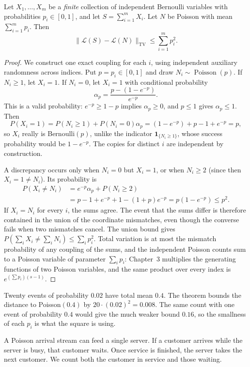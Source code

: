 \begin{theorem}[Le Cam]\label{thm:lecam}
Let $X_1,\ldots,X_m$ be a \emph{finite} collection of independent Bernoulli variables with probabilities $p_i\in[0,1]$, and let $S=\sum_{i=1}^m X_i$. Let $N$ be Poisson with mean $\sum_{i=1}^m p_i$. Then
\[
 \|\mathcal L(S)-\mathcal L(N)\|_{\mathrm{TV}}\le\sum_{i=1}^m p_i^2.
\]
\end{theorem}
\begin{proof}
We construct one exact coupling for each $i$, using independent auxiliary randomness across indices. Put $p=p_i\in[0,1]$ and draw $N_i\sim\operatorname{Poisson}(p)$. If $N_i\ge1$, let $X_i=1$. If $N_i=0$, let $X_i=1$ with conditional probability
\[
\alpha_p=\frac{p-(1-e^{-p})}{e^{-p}}.
\]
This is a valid probability: $e^{-p}\ge1-p$ implies $\alpha_p\ge0$, and $p\le1$ gives $\alpha_p\le1$. Then
\[
P(X_i=1)=P(N_i\ge1)+P(N_i=0)\alpha_p=(1-e^{-p})+p-1+e^{-p}=p,
\]
so $X_i$ really is Bernoulli$(p)$, unlike the indicator $\mathbf1_{\{N_i\ge1\}}$, whose success probability would be $1-e^{-p}$. The copies for distinct $i$ are independent by construction.

A discrepancy occurs only when $N_i=0$ but $X_i=1$, or when $N_i\ge2$ (since then $X_i=1\ne N_i$). Its probability is
\[
\begin{aligned}
P(X_i\ne N_i)&=e^{-p}\alpha_p+P(N_i\ge2)\\
&=p-1+e^{-p}+1-(1+p)e^{-p}
=p(1-e^{-p})\le p^2.
\end{aligned}
\]
If $X_i=N_i$ for every $i$, the sums agree. The event that the sums differ is therefore contained in the union of the coordinate mismatches, even though the converse fails when two mismatches cancel. The union bound gives $P(\sum_iX_i\ne\sum_iN_i)\le\sum_i p_i^2$. Total variation is at most the mismatch probability of any coupling of the sums, and the independent Poisson counts sum to a Poisson variable of parameter $\sum_i p_i$: Chapter~3 multiplies the generating functions of two Poisson variables, and the same product over every index is $e^{(\sum p_i)(s-1)}$.
\end{proof}

Twenty events of probability $0.02$ have total mean $0.4$. The theorem bounds the distance to Poisson$(0.4)$ by $20\cdot(0.02)^2=0.008$. The same count with one event of probability $0.4$ would give the much weaker bound $0.16$, so the smallness of each $p_i$ is what the square is using.

A Poisson arrival stream can feed a single server. If a customer arrives while the server is busy, that customer waits. Once service is finished, the server takes the next customer. We count both the customer in service and those waiting.

